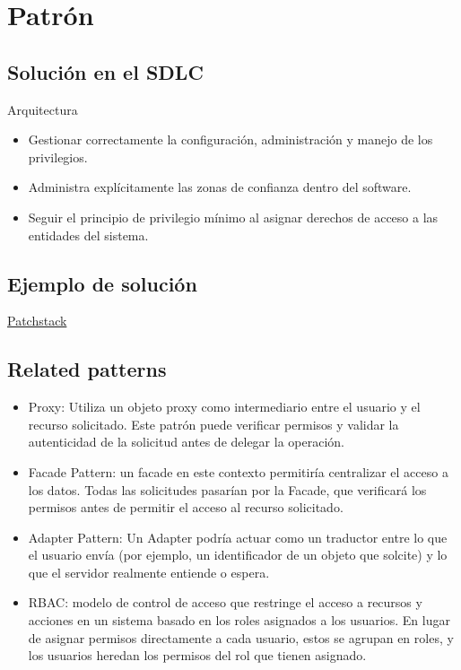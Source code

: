 \section{Patrón}
\subsection*{Solución en el SDLC}
Arquitectura
\begin{itemize}
    \item Gestionar correctamente la configuración, administración y manejo de los privilegios.
    \item Administra explícitamente las zonas de confianza dentro del software.
    \item Seguir el principio de privilegio mínimo al asignar derechos de acceso a las entidades del sistema.
\end{itemize}
\subsection*{Ejemplo de solución}
\href{https://patchstack.com/academy/wordpress/securing-code/privilege-escalation/}{Patchstack}
\subsection*{Related patterns}

\begin{itemize}
    \item Proxy: Utiliza un objeto proxy como intermediario entre el usuario y el recurso solicitado.
Este patrón puede verificar permisos y validar la autenticidad de la solicitud antes de
delegar la operación.
    \item Facade Pattern: un facade en este contexto permitiría centralizar el acceso a los datos.
    Todas las solicitudes pasarían por la Facade, que verificará los permisos antes de permitir
    el acceso al recurso solicitado.
    \item Adapter Pattern: Un Adapter podría actuar como un traductor entre lo que el usuario
    envía (por ejemplo, un identificador de un objeto que solcite) y lo que el servidor
    realmente entiende o espera.
    \item RBAC: modelo de control de acceso que restringe el acceso a recursos y acciones en un
    sistema basado en los roles asignados a los usuarios. En lugar de asignar permisos directamente a cada usuario, estos se agrupan en roles, y los usuarios heredan los permisos
    del rol que tienen asignado.
\end{itemize}




